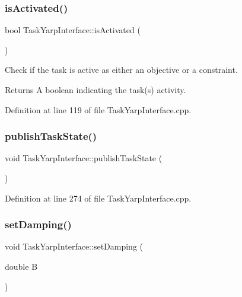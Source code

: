 \subsubsection{\texorpdfstring{is\+Activated()}{isActivated()}}
{\footnotesize\ttfamily bool Task\+Yarp\+Interface\+::is\+Activated (\begin{DoxyParamCaption}{ }\end{DoxyParamCaption})}

Check if the task is active as either an objective or a constraint.

\begin{DoxyReturn}{Returns}
A boolean indicating the task(s) activity. 
\end{DoxyReturn}


Definition at line 119 of file Task\+Yarp\+Interface.\+cpp.

\hypertarget{classocra_1_1TaskYarpInterface_a758e222fe2e69f6932b13e275636e7be}{}\label{classocra_1_1TaskYarpInterface_a758e222fe2e69f6932b13e275636e7be} 
\subsubsection{\texorpdfstring{publish\+Task\+State()}{publishTaskState()}}
{\footnotesize\ttfamily void Task\+Yarp\+Interface\+::publish\+Task\+State (\begin{DoxyParamCaption}{ }\end{DoxyParamCaption})}



Definition at line 274 of file Task\+Yarp\+Interface.\+cpp.

\hypertarget{classocra_1_1TaskYarpInterface_af8523d8d22368ee189c840dc96df66c4}{}\label{classocra_1_1TaskYarpInterface_af8523d8d22368ee189c840dc96df66c4} 
\subsubsection{\texorpdfstring{set\+Damping()}{setDamping()}\hspace{0.1cm}{\footnotesize\ttfamily [1/3]}}
{\footnotesize\ttfamily void Task\+Yarp\+Interface\+::set\+Damping (\begin{DoxyParamCaption}\item[{double}]{B }\end{DoxyParamCaption})}

